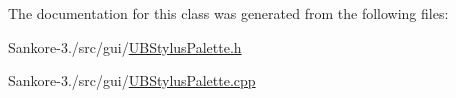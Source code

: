The documentation for this class was generated from the following files\-:\begin{DoxyCompactItemize}
\item 
Sankore-\/3./src/gui/\hyperlink{_u_b_stylus_palette_8h}{U\-B\-Stylus\-Palette.\-h}\item 
Sankore-\/3./src/gui/\hyperlink{_u_b_stylus_palette_8cpp}{U\-B\-Stylus\-Palette.\-cpp}\end{DoxyCompactItemize}
